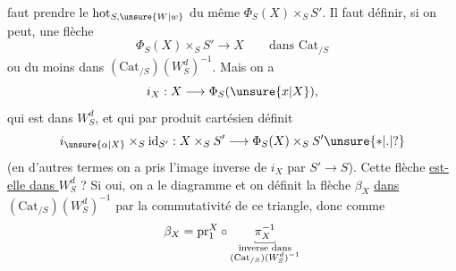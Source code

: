 faut prendre le $\mathrm{hot}_{S,\unsure{W|w}}$ du même $\Phi_S(X)\times_S S'$.  Il faut définir, si on peut, une flèche
\[
 \Phi_S(X)\times_S S'\longrightarrow X\qquad\text{dans }\mathrm{Cat}_{/S}
\]
ou du moins dans $(\mathrm{Cat}_{/S})(W_S^d)^{-1}$.  Mais on a
\[
 i_X:X\longrightarrow\Phi_S(\unsure{x|X}),
\]
qui est dans $W_S^d$, et qui par produit cartésien définit
\[
 i_{\unsure{\alpha|X}}\times_S\mathrm{id}_{S'}:X\times_S S'\longrightarrow\Phi_S(X)\times_S S'\unsure{*|.|?}
\]
(en d'autres termes on a pris l'image inverse de $i_X$ par $S'\longrightarrow S$).  Cette  flèche \uline{est-elle  dans $W_S^d$} ?
Si oui, on a le diagramme
et on définit la flèche  $\beta_X$ \uline{dans $(\mathrm{Cat}_{/S})(W_S^d)^{-1}$} par la commutativité de ce triangle, donc comme
\[
 \beta_X=\mathrm{pr}_1^X\circ\underset{\substack{\rule{.35pt}{.4ex}\rule{1.6em}{.35pt}\rule{.35pt}{.4ex}\\\text{inverse dans}\\(\mathrm{Cat}_{/S})(W_S^d)^{-1}}}{\pi_X^{-1}}
\]
